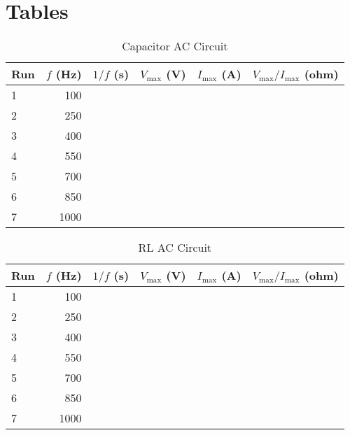 \section{Tables}
\begin{table}[ht]
	\begin{center}
		\begin{tabular}{|l|r|r|r|r|r|}\hline
			Run & $f$ (Hz) & $1/f$ (s) & $V_{\text{max}}$ (V) & $I_{\text{max}}$ (A) & $V_{\text{max}}/I_{\text{max}}$ (ohm) \\
			\hline
			1 & 100 & & & & \\
			2 & 250 & & & & \\
			3 & 400 & & & & \\
			4 & 550 & & & & \\
			5 & 700 & & & & \\
			6 & 850 & & & & \\
			7 & 1000 & & & & \\
			\hline
		\end{tabular}
	\end{center}
	\caption{Capacitor AC Circuit}
	\label{table.capacitor}
\end{table}
\begin{table}[ht]
	\begin{center}
		\begin{tabular}{|l|r|r|r|r|r|}\hline
			Run & $f$ (Hz) & $1/f$ (s) & $V_{\text{max}}$ (V) & $I_{\text{max}}$ (A) & $V_{\text{max}}/I_{\text{max}}$ (ohm) \\
			\hline
			1 & 100 & & & & \\
			2 & 250 & & & & \\
			3 & 400 & & & & \\
			4 & 550 & & & & \\
			5 & 700 & & & & \\
			6 & 850 & & & & \\
			7 & 1000 & & & & \\
			\hline
		\end{tabular}
	\end{center}
	\caption{RL AC Circuit}
	\label{table.RL}
\end{table}
